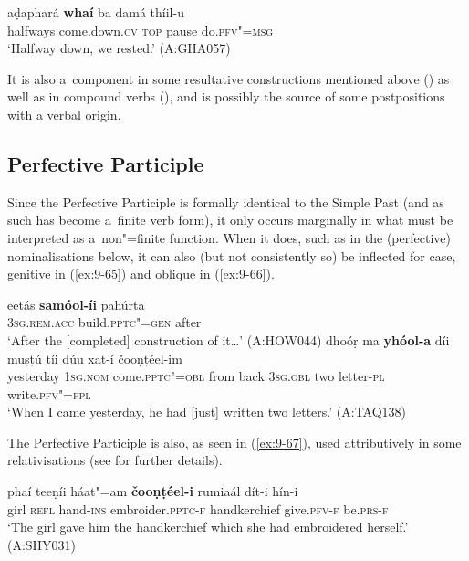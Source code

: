 \begin{exe}
\ex
\label{ex:9-64}
\gll aḍaphará \textbf{whaí} ba damá thíil-u \\
halfways come.down.\textsc{cv} \textsc{top} pause do.\textsc{pfv"=msg} \\
\glt `Halfway down, we rested.' (A:GHA057)
\end{exe}

It is also a~component in some resultative constructions mentioned above () as well as in compound verbs (), and is possibly the source of some postpositions with a verbal origin.


\subsection{Perfective Participle}
\label{subsec:9-3-2}


Since the Perfective Participle is formally identical to the Simple Past (and as such has become a~finite verb form), it only occurs marginally in what must be interpreted as a~non"=finite function. When it does, such as in the (perfective) nominalisations below, it can also (but not consistently so) be inflected for case, genitive in (\ref{ex:9-65}) and oblique in (\ref{ex:9-66}).

\ea
\label{ex:9-65}
\gll eetás \textbf{samóol-íi} pahúrta \\
\textsc{3sg.rem.acc} build.\textsc{pptc"=gen} after \\
\glt `After the [completed] construction of it{\ldots}' (A:HOW044) 
\ex
\label{ex:9-66}
\gll dhoóṛ ma \textbf{yhóol-a} díi muṣṭú tíi dúu xat-í čooṇṭéel-im\\
yesterday 1\textsc{sg.nom} come.\textsc{pptc"=obl} from back \textsc{3sg.obl} two letter-\textsc{pl} write.\textsc{pfv"=fpl}\\
\glt `When I came yesterday, he had [just] written two letters.' (A:TAQ138)
\z

The Perfective Participle is also, as seen in (\ref{ex:9-67}), used attributively in some relativisations (see  for further details).

\begin{exe}
\ex
\label{ex:9-67}
\gll phaí teeṇíi háat"=am \textbf{čooṇṭéel-i} rumiaál dít-i hín-i \\
girl \textsc{refl} hand-\textsc{ins} embroider.\textsc{pptc-f} handkerchief give.\textsc{pfv-f} be.\textsc{prs-f} \\
\glt `The girl gave him the handkerchief which she had embroidered herself.' (A:SHY031)
\end{exe}

